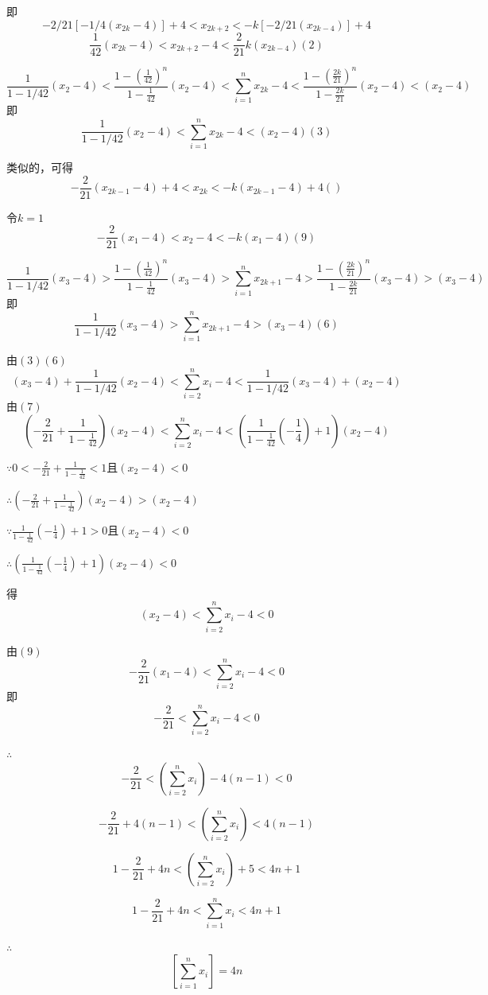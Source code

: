 \documentclass[10pt,a4paper]{article}
\newcommand{\sigm}[2]{\sum^{#2}_{i=#1}}
\newcommand{\xiab}[1]{_{#1}}
\newcommand{\so}{\therefore}
\newcommand{\be}{\because}
\begin{document}
即$$ -2/21[-1/4(x\xiab{2k}-4)]+4
<x\xiab{2k+2}<
-k[-2/21(x\xiab{2k-4})]+4   
$$
$$\frac{1}{42}(x_{2k}-4)<x\xiab{2k+2}-4<\frac{2}{21}k(x\xiab{2k-4})(2)$$

$$\frac{1}{1-1/42}(x\xiab{2}-4)
<\frac{1-(\frac{1}{42})^{n}}{1-\frac{1}{42}}(x\xiab{2}-4)
<\sigm{1}{n} x\xiab{2k}-4
<\frac{1-(\frac{2k}{21})^{n}}{1-\frac{2k}{21}}(x\xiab{2}-4)
<(x\xiab{2}-4)
$$
即$$\frac{1}{1-1/42}(x\xiab{2}-4)<
\sigm{1}{n} x\xiab{2k}-4
<(x\xiab{2}-4)                       (3)
$$

类似的，可得
$$-\frac{2}{21}(x_{2k-1}-4)+4<x_{2k}<-k(x_{2k-1}-4)+4     ()$$

令$k=1$ $$-\frac{2}{21}(x_{1}-4)<x_{2}-4<-k(x_{1}-4)    (9)$$






$$\frac{1}{1-1/42}(x\xiab{3}-4)
>\frac{1-(\frac{1}{42})^{n}}{1-\frac{1}{42}}(x\xiab{3}-4)
>\sigm{1}{n} x\xiab{2k+1}-4
>\frac{1-(\frac{2k}{21})^{n}}{1-\frac{2k}{21}}(x\xiab{3}-4)
>(x\xiab{3}-4)
$$
即$$\frac{1}{1-1/42}(x\xiab{3}-4)>
\sigm{1}{n} x\xiab{2k+1}-4
>(x\xiab{3}-4)                       (6)
$$


由$(3)(6)$
$$(x\xiab{3}-4)+\frac{1}{1-1/42}(x\xiab{2}-4)<
\sigm{2}{n} x\xiab{i}-4<
\frac{1}{1-1/42}(x\xiab{3}-4)+(x\xiab{2}-4)  
$$
由$(7)$
$$(-\frac{2}{21}+\frac{1}{1-\frac{1}{42}})(x\xiab{2}-4)
<\sigm{2}{n} x\xiab{i}-4<
(\frac{1}{1-\frac{1}{42}}(-\frac{1}{4})+1)(x\xiab{2}-4)$$

$\be  0<-\frac{2}{21}+\frac{1}{1-\frac{1}{42}}<1$且$(x\xiab{2}-4)<0$


$\so (-\frac{2}{21}+\frac{1}{1-\frac{1}{42}})(x\xiab{2}-4)>
(x\xiab{2}-4)$


$\be \frac{1}{1-\frac{1}{42}}(-\frac{1}{4})+1>0$且$(x\xiab{2}-4)<0$


$\so (\frac{1}{1-\frac{1}{42}}(-\frac{1}{4})+1)(x\xiab{2}-4)<0$


得$$
(x\xiab{2}-4)<
\sigm{2}{n} x\xiab{i}-4
<0$$

由$(9)$
$$
-\frac{2}{21}(x\xiab{1}-4)<
\sigm{2}{n} x\xiab{i}-4
<0$$
即
$$
-\frac{2}{21}<
\sigm{2}{n} x\xiab{i}-4
<0$$

$\so $ $$
-\frac{2}{21}<
(\sigm{2}{n} x\xiab{i})-4(n-1)
<0$$

$$
-\frac{2}{21}+4(n-1)<
(\sigm{2}{n} x\xiab{i})
<4(n-1)$$

$$
1-\frac{2}{21}+4n<
(\sigm{2}{n} x\xiab{i})+5
<4n+1$$

$$
1-\frac{2}{21}+4n<
\sigm{1}{n} x\xiab{i}
<4n+1$$

$\so $
$$[\sigm{1}{n}x\xiab{i}]= 4n$$
\end{document}
